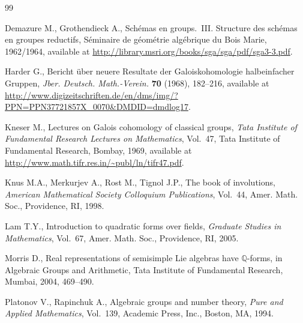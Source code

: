 \begin{thebibliography}{99}

\footnotesize\itemsep=0pt

Demazure M., Grothendieck A., Sch\'emas en groups.~III. Structure des sch\'emas
  en groupes reductifs, S\'eminaire de g\'eom\'etrie alg\'ebrique du {B}ois
  {M}arie, 1962/1964, available at
  \url{http://library.msri.org/books/sga/sga/pdf/sga3-3.pdf}.

Harder G., Bericht \"uber neuere {R}esultate der {G}aloiskohomologie
  halbeinfacher {G}ruppen, \textit{Jber. Deutsch. Math.-Verein.} \textbf{70}
  (1968), 182--216, available at
  \url{http://www.digizeitschriften.de/en/dms/img/?PPN=PPN37721857X_0070&DMDID=dmdlog17}.

Kneser M., Lectures on {G}alois cohomology of classical groups, \textit{Tata
  Institute of Fundamental Research Lectures on Mathematics}, Vol.~47, Tata
  Institute of Fundamental Research, Bombay, 1969, available at
  \url{http://www.math.tifr.res.in/~publ/ln/tifr47.pdf}.

Knus M.A., Merkurjev A., Rost M., Tignol J.P., The book of involutions,
  \textit{American Mathematical Society Colloquium Publications}, Vol.~44,
  Amer. Math. Soc., Providence, RI, 1998.

Lam T.Y., Introduction to quadratic forms over f\/ields, \textit{Graduate Studies
  in Mathematics}, Vol.~67, Amer. Math. Soc., Providence, RI, 2005.

Morris D., Real representations of semisimple {L}ie algebras have {${\mathbb
  Q}$}-forms, in Algebraic Groups and Arithmetic, Tata Institute of Fundamental
  Research, Mumbai, 2004, 469--490.

Platonov V., Rapinchuk A., Algebraic groups and number theory, \textit{Pure and
  Applied Mathematics}, Vol.~139, Academic Press, Inc., Boston, MA, 1994.


\end{thebibliography}
